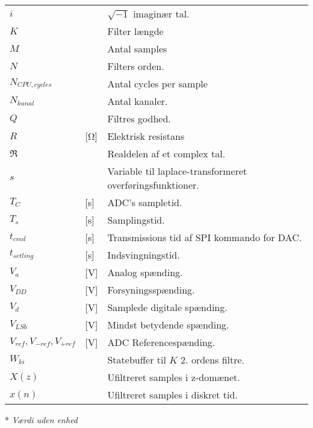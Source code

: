 \begin{table}[h!]
\begin{threeparttable}
\begin{tabular}{l l l}
$i$\tnote{*}		&					& $\sqrt{-1}$ imaginær tal.	\\
$K$ & & Filter længde\\
$M$\tnote{*}        &                   & Antal samples \\ 
$N$\tnote{*}        &                   & Filters orden.\\
$N_{CPU,cycles}$ & & Antal cycles per sample \\
$N_{kanal}$\tnote{*} & & Antal kanaler. \\
$Q$\tnote{*}        &                   & Filtres godhed.\\
$R$ & [\si{\ohm}] & Elektrisk resistans \\
$\Re$\tnote{*}		&					& Realdelen af et complex tal.	\\
$s$\tnote{*}		&					& Variable til laplace-transformeret overføringsfunktioner.\\
$T_C$ &[\si{\second}] & ADC's sampletid. \\
$T_s$ & [\si{\second}] & Samplingstid. \\
$t_{cmd}$ & [\si{\second}] & Transmissions tid af SPI kommando for DAC.\\
$t_{setling}$ &[\si{\second}] & Indsvingningstid. \\
$V_a$ &[\si{\volt}] & Analog spænding. \\
$V_{DD}$ & [\si{\volt}] & Forsyningsspænding. \\
$V_d$ & [\si{\volt}]& Samplede digitale spænding.\\
$V_{LSb}$ & [\si{\volt}] & Mindst betydende spænding. \\
$V_{ref},V_{-ref},V_{+ref}$ & [\si{\volt}] & ADC Referencespænding. \\
$W_{ki}$\tnote{*}	    &   			& Statebuffer til $K$ 2. ordens filtre.\\
$X(z)$\tnote{*}	    &		            & Ufiltreret samples i  z-domænet.	\\
$x(n)$\tnote{*}	    &		            & Ufiltreret samples i diskret tid.	\\
\bottomrule
\end{tabular}
\begin{tablenotes}
\item[*] \textit{Værdi uden enhed}
\end{tablenotes}
\end{threeparttable}
\end{table}




